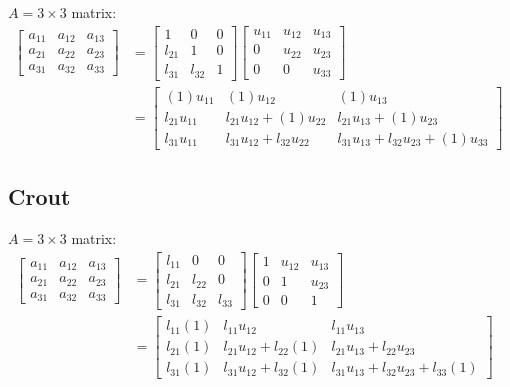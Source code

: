 		$A = 3 \times 3$ matrix:
		\begin{align}
			\begin{bmatrix}
				a_{11} & a_{12} & a_{13} \\
				a_{21} & a_{22} & a_{23} \\
				a_{31} & a_{32} & a_{33}
			\end{bmatrix} &=
			\begin{bmatrix}
				1 & 0 & 0 \\
				l_{21} & 1 & 0 \\
				l_{31} & l_{32} & 1
			\end{bmatrix}
			\begin{bmatrix}
				u_{11} & u_{12} & u_{13} \\
				0 & u_{22} & u_{23} \\
				0 & 0 & u_{33}
			\end{bmatrix}
			& \\ &=
			\begin{bmatrix}
				(1)u_{11} & (1)u_{12} & (1)u_{13} \\
				l_{21} u_{11} & l_{21} u_{12} + (1)u_{22}
					& l_{21} u_{13} + (1)u_{23} \\
				l_{31} u_{11} & l_{31} u_{12} + l_{32} u_{22}
					& l_{31} u_{13} + l_{32} u_{23} + (1)u_{33}
			\end{bmatrix}&
		\end{align}

	\subsection{Crout}

		$A = 3 \times 3$ matrix:
		\begin{align}
			\begin{bmatrix}
				a_{11} & a_{12} & a_{13} \\
				a_{21} & a_{22} & a_{23} \\
				a_{31} & a_{32} & a_{33}
			\end{bmatrix} &=
			\begin{bmatrix}
				l_{11} & 0 & 0 \\
				l_{21} & l_{22} & 0 \\
				l_{31} & l_{32} & l_{33}
			\end{bmatrix}
			\begin{bmatrix}
				1 & u_{12} & u_{13} \\
				0 & 1 & u_{23} \\
				0 & 0 & 1
			\end{bmatrix}
			& \\ &=
			\begin{bmatrix}
				l_{11}(1) & l_{11} u_{12} & l_{11} u_{13} \\
				l_{21}(1) & l_{21} u_{12} + l_{22}(1)
					& l_{21} u_{13} + l_{22} u_{23} \\
				l_{31}(1) & l_{31} u_{12} + l_{32}(1)
					& l_{31} u_{13} + l_{32} u_{23} + l_{33}(1)
			\end{bmatrix}&
		\end{align}


